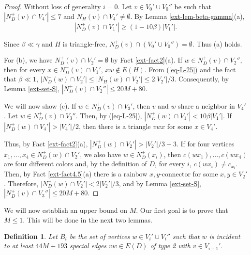 \documentclass{article}
\newtheorem{defn}[theorem]{Definition}
\begin{document}
\begin{proof}
Without loss of generality $i=0$.  Let $v\in V_0'\cup V_0''$ be such that $|N^+_D(v)\cap V_{4}'|\leq 7$ and $N_H(v)\cap V_{4}'\neq \emptyset$. By Lemma \ref{ext-lem-beta-gamma}(a), \begin{equation}\label{eq-L-25}|N^+_D(v)\cap V_{1}'|\geq (1-10\beta)|V_1'|.\end{equation}

Since $\beta\ll \gamma$ and $H$ is triangle-free, $N_D^+(v)\cap (V_{0}'\cup V_0'')=\emptyset$. Thus (a) holds.

For (b), we have $N_D^+(v)\cap V_2'=\emptyset$  by Fact \ref{ext-fact2}(a). If $w\in N_D^+(v)\cap V_{2}''$, then for every $x\in N_D^+(v)\cap V_1'$, $xw\notin E(H)$. From (\ref{eq-L-25}) and the fact that $\beta \ll 1$, $|N^-_D(w)\cap V_2'|\leq |N_H(w)\cap V_2'|\leq  2|V_2'|/3$. Consequently, by Lemma \ref{ext-set-S}, $|N_D^+(v)\cap V_{2}''|\leq 20M+80.$

We will now show (c). If $w\in N^+_D(v)\cap V_{3}'$, then $v$ and $w$ share a neighbor in $V_{4}'$. Let $w\in N^+_D(v)\cap V_{3}''.$  Then, by (\ref{eq-L-25}), $|N^+_D(w)\cap V_1'|<10\beta |V_1'|$. If $|N^+_D(w)\cap V_{4}'|>|V_4'|/2$, then there is a triangle $vwx$ for some $x\in V_4'$. 

Thus, by Fact \ref{ext-fact2}(a), $|N^+_D(w)\cap V_2'|>|V_2'|/3+3$. If for four vertices $x_1, \dots, x_4\in N^+_D(w)\cap V_2'$, we also have $w\in N^+_D(x_i)$, then $c(wx_1),\dots, c(wx_4)$ are four different colors and, by the definition of $D$, for every $i$, $c(wx_i)\neq c_{x_i}$. Then, by Fact \ref{ext-fact4.5}(a) there is a rainbow $x,y$-connector for some $x,y\in V_2'$. Therefore, $|N^-_D(w) \cap V_2'| < 2|V_2'|/3$, and  by Lemma \ref{ext-set-S}, $|N^+_D(v)\cap V_3''|\leq 20M +80.$ 
\end{proof}

We will now establish an upper bound on $M$. Our first goal is to prove that $M\leq 1$. This will be done in the next two lemmas.
\begin{defn}
Let $B_i$ be the set of vertices $w\in V_i'\cup V_i''$ such that $w$ is incident to at least $44M+193$ special edges $vw\in E(D)$ of type 2 with $v\in V_{i+1}'.$\end{defn}
\end{document}
